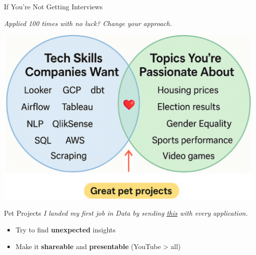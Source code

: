 \documentclass[10pt,a4paper]{article}
\begin{document}
\begin{multicols}{3}
\begin{textboxGray}{If You're Not Getting Interviews}
\begin{itemize}
	\end{itemize}
\emph{Applied 100 times with no luck? Change your approach.}
\end{textboxGray}

\begin{textboxWhite}{}
\includegraphics[width=\textwidth]{image.png}
\end{textboxWhite}

	
\begin{textboxRed}{Pet Projects}
\emph{I landed my first job in Data by sending \underline{\href{https://www.youtube.com/watch?v=54jvW1ulaP0&t=961s}{this}} with every application.}

\begin{itemize}
    \item Try to find \textbf{unexpected} insights
    \item Make it \textbf{shareable} and \textbf{presentable} (YouTube > all)
\end{itemize}


\end{textboxRed}
\end{multicols}
\end{document}
